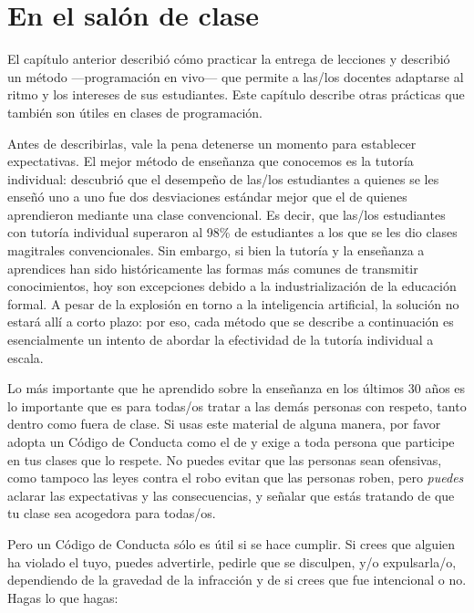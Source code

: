 \chapter{En el salón de clase}\label{s:classroom}

El capítulo anterior describió cómo practicar la entrega de lecciones
y describió un método ---programación en vivo--- que
permite a las/los docentes adaptarse al ritmo y los intereses de sus estudiantes.
Este capítulo describe otras prácticas que también son útiles en clases de programación.

Antes de describirlas,
vale la pena detenerse un momento para establecer expectativas.
El mejor método de enseñanza que conocemos es la tutoría individual: 
\cite{Bloo1984} descubrió que el desempeño de las/los estudiantes a quienes se les enseñó uno a uno
fue dos desviaciones estándar mejor que el de quienes aprendieron mediante una clase convencional.
Es decir, que las/los estudiantes con tutoría individual superaron al
98\% de estudiantes a los que se les dio clases magitrales convencionales.
Sin embargo,
si bien la tutoría y la enseñanza a aprendices han sido históricamente las formas más comunes de transmitir conocimientos,
hoy son excepciones debido a la
industrialización de la educación formal.
A pesar de la explosión en torno a la inteligencia artificial,
la solución no estará allí a corto plazo:
por eso, cada método que se describe a continuación es esencialmente
un intento de abordar la efectividad de la tutoría individual a escala.


Lo más importante que he aprendido sobre la enseñanza en los últimos 30 años es
lo importante que es para todas/os tratar a las demás personas con respeto,
tanto dentro como fuera de clase.
Si usas este material de alguna manera,
por favor adopta un Código de Conducta como el de 
y exige a toda persona que participe en tus clases que lo respete.
No puedes evitar que las personas sean ofensivas,
como tampoco las leyes contra el robo evitan que las personas roben,
pero \emph{puedes} aclarar las expectativas y las consecuencias,
y señalar que estás tratando de que tu clase sea acogedora para todas/os.

Pero un Código de Conducta sólo es útil si se hace cumplir.
Si crees que alguien ha violado el tuyo,
puedes advertirle,
pedirle que se disculpen,
y/o expulsarla/o,
dependiendo de la gravedad de la infracción y de si crees que fue intencional o no.
Hagas lo que hagas:

